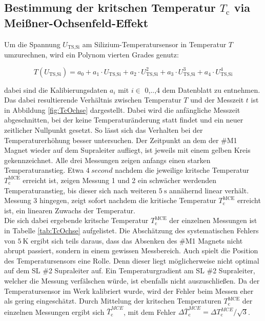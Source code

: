 \subsection{Bestimmung der kritschen Temperatur $T_{\text{c}}$ via Meißner-Ochsenfeld-Effekt}
\label{sec:TcOchse}

Um die Spannung $U_{\text{TS,Si}}$ am Silizium-Temperatursensor in Temperatur $T$
umzurechnen, wird ein Polynom vierten Grades genutz:

\begin{equation*}
  T(U_{\text{TS,Si}}) = a_0 + a_1 \cdot U_{\text{TS,Si}} + a_2 \cdot U_{\text{TS,Si}}^2
  + a_3 \cdot U_{\text{TS,Si}}^3 + a_4 \cdot U_{\text{TS,Si}}^4
  \label{FA1}
\end{equation*}

\noindent
dabei sind die Kalibierungsdaten $a_{i}$ mit $i \in$ {0,..,4} dem Datenblatt
zu entnehmen. Das dabei resultierende Verhältnis zwischen Temperatur $T$ und der
Messzeit $t$ ist in Abbildung \ref{fig:TcOchse} dargestellt. Dabei wird die anfängliche
Messzeit abgeschnitten, bei der keine Temperaturänderung statt findet und ein
neuer zeitlicher Nullpunkt gesetzt. So lässt sich das Verhalten bei der
Temperaturerhöhung besser untersuchen. Der Zeitpunkt an dem der \#M1 Magnet wieder
auf dem Supraleiter aufliegt, ist jeweils mit einem gelben Kreis gekennzeichnet.
Alle drei Messungen zeigen anfangs einen starken Temperaturanstieg. Etwa $\SI{4}{second}$
nachdem die jeweilige kritsche Temperatur $T^{\text{MCE}}_{\text{c}}$ erreicht ist, zeigen
Messung 1 und 2 ein schwächer werdenden Temperaturanstieg, bis dieser sich nach
weiteren $\SI{5}{\second}$ annähernd linear verhält. Messung 3 hingegen, zeigt
sofort nachdem die kritische Temperatur $T^{\text{MCE}}_{\text{c}}$ erreicht ist, ein linearen
Zuwachs der Temperatur.\\
Die sich dabei ergebende kritsche Temperatur $T^{\text{MCE}}_{\text{c}}$ der einzelnen
Messungen ist in Tabelle \ref{tab:TcOchse} aufgelistet. Die Abschätzung des
systematischen Fehlers von $\SI{5}{\kelvin}$ ergibt sich teils daraus, dass das
Absenken des \#M1 Magnets nicht abrupt passiert, sondern in einem gewissen Messbereich.
Auch spielt die Position des Temperatursensors eine Rolle. Denn dieser liegt
möglicherweise nicht optimal auf dem SL \#2 Supraleiter auf. Ein Temperaturgradient
am SL \#2 Supraleiter, welcher die Messung verfälschen würde, ist ebenfalls nicht
auszuschließen. Da der Temperatursensor im Werk kalibriert wurde, wird der Fehler
beim Messen eher als gering eingeschätzt.
Durch Mittelung der kritschen Temperaturen $T^{\text{MCE}}_{\text{c}}$ der einzelnen Messungen
ergibt sich $\bar{T}^{MCE}_{\text{c}}$, mit dem Fehler $\Delta \bar{T}^{MCE}_{\text{c}} =
\Delta T^{MCE}_{\text{c}}/\sqrt{3}$.



